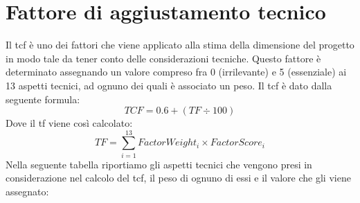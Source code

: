 \section{Fattore di aggiustamento tecnico}
Il \gls{tcf} è uno dei fattori che viene applicato alla stima della dimensione del progetto in modo tale da tener conto delle considerazioni tecniche.
Questo fattore è determinato assegnando un valore compreso fra 0 (irrilevante) e 5 (essenziale) ai 13 aspetti tecnici, ad ognuno dei quali è associato un peso. 
Il \gls{tcf} è dato dalla seguente formula:
\begin{displaymath}
	TCF = 0.6 + (TF \div 100)
\end{displaymath}
Dove il \gls{tf} viene così calcolato:
\begin{displaymath}
	TF = \sum_{i=1}^{13}FactorWeight_i \times FactorScore_i 
\end{displaymath}
Nella seguente tabella riportiamo gli aspetti tecnici che vengono presi in considerazione nel calcolo del \gls{tcf}, il peso di ognuno di essi e il valore che gli viene assegnato:
